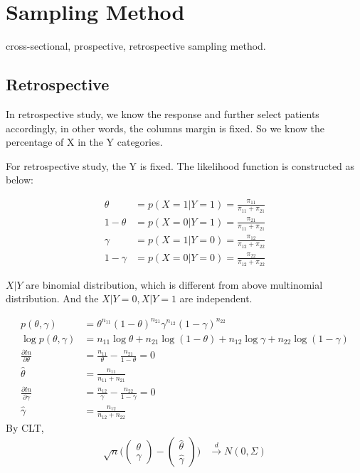 	\section{Sampling Method}
	 cross-sectional, prospective, retrospective sampling method.\\
	

	\subsection{Retrospective}
	In retrospective study, we know the response and further select patients accordingly, in other words, the columns margin is fixed. So we know the percentage of X in the Y categories. 
	
	For retrospective study, the Y is fixed. The likelihood function is constructed as below:
	
	\begin{align*}
		\theta &= p(X=1|Y=1) = \frac{\pi_{11}}{\pi_{11} + \pi_{21}}\\
		1- \theta &= p(X=0|Y=1) = \frac{\pi_{21}}{\pi_{11} + \pi_{21}}\\
		\gamma &= p(X=1|Y=0) = \frac{\pi_{12}}{\pi_{12} + \pi_{22}}\\
		1- \gamma &= p(X=0|Y=0) = \frac{\pi_{22}}{\pi_{12} + \pi_{22}}
	\end{align*} 
	
	$X | Y$ are binomial distribution, which is different from above multinomial distribution. And the $X|Y=0, X|Y=1$ are independent. 
	
	\begin{align*}
		p(\theta, \gamma) &= \theta^{n_{11}} (1-\theta)^{n_{21}} \gamma^{n_{12}} (1-\gamma)^{n_{22}}\\
		\log p(\theta, \gamma) &= n_{11} \log \theta + n_{21} \log (1-\theta) + n_{12} \log \gamma + n_{22} \log(1-\gamma)\\
		\frac{\partial ln}{\partial \theta} &= \frac{n_{11}}{\theta} - \frac{n_{21}}{1-\theta} = 0\\
		\hat{\theta} &= \frac{n_{11}}{n_{11}+ n_{21}}\\
		\frac{\partial ln}{\partial \gamma} &= \frac{n_{12}}{\gamma} - \frac{n_{22}}{1-\gamma} = 0\\
		\hat{\gamma} &= \frac{n_{12}}{n_{12}+ n_{22}}
	\end{align*} 
	By CLT,
	\begin{align*}
		\sqrt{n} \Bigg ( \begin{pmatrix} 
		\theta \\
		\gamma
		\end{pmatrix} -  \begin{pmatrix} 
		\hat{\theta} \\
		\hat{\gamma}
		\end{pmatrix} \Bigg ) & \xrightarrow{d}  N(0, \Sigma)
	\end{align*} 
		
